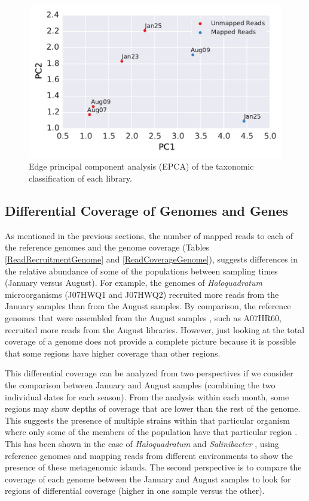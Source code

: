 \begin{figure}[hbt]
  \centering
  \includegraphics[width=\textwidth]{Chapter5/Figures/Unmapped_Mapped_EPCA.pdf}
  \caption{Edge principal component analysis (EPCA) of the taxonomic classification of each library.}
  \label{EPCA_results}
\end{figure}


\clearpage
\subsection{Differential Coverage of Genomes and Genes}

As mentioned in the previous sections, the number of mapped reads to each of the reference genomes and the genome coverage (Tables \ref{ReadRecruitmentGenome} and \ref{ReadCoverageGenome}), suggests differences in the relative abundance of some of the populations between sampling times (January versus August). For example, the genomes of \textit{Haloquadratum} microorganisms (J07HWQ1 and J07HWQ2) recruited more reads from the January samples than from the August samples. By comparison, the reference genomes that were assembled from the August samples \cite{Podell:2013fp}, such as A07HR60, recruited more reads from the August libraries. However, just looking at the total coverage of a genome does not provide a complete picture because it is possible that some regions have higher coverage than other regions.

This differential coverage can be analyzed from two perspectives if we consider the comparison between January and August samples (combining the two individual dates for each season). From the analysis within each month, some regions may show depths of coverage that are lower than the rest of the genome. This suggests the presence of multiple strains within that particular organism where only some of the members of the population have that particular region \cite{Pasic:2009bo,Legault:2006kh,Allen:2005dg}. This has been shown in the case of \textit{Haloquadratum} \cite{Legault:2006kh} and \textit{Salinibacter} \cite{Pasic:2009bo}, using reference genomes and mapping reads from different environments to show the presence of these metagenomic islands. The second perspective is to compare the coverage of each genome between the January and August samples to look for regions of differential coverage (higher in one sample versus the other).


